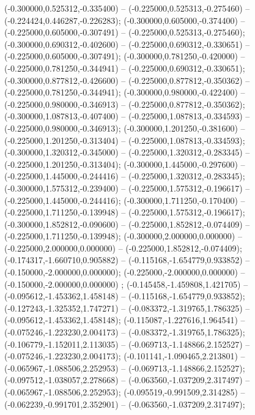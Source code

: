  (-0.300000,0.525312,-0.335400) -- (-0.225000,0.525313,-0.275460) -- (-0.224424,0.446287,-0.226283);
 (-0.300000,0.605000,-0.374400) -- (-0.225000,0.605000,-0.307491) -- (-0.225000,0.525313,-0.275460);
 (-0.300000,0.690312,-0.402600) -- (-0.225000,0.690312,-0.330651) -- (-0.225000,0.605000,-0.307491);
 (-0.300000,0.781250,-0.420000) -- (-0.225000,0.781250,-0.344941) -- (-0.225000,0.690312,-0.330651);
 (-0.300000,0.877812,-0.426600) -- (-0.225000,0.877812,-0.350362) -- (-0.225000,0.781250,-0.344941);
 (-0.300000,0.980000,-0.422400) -- (-0.225000,0.980000,-0.346913) -- (-0.225000,0.877812,-0.350362);
 (-0.300000,1.087813,-0.407400) -- (-0.225000,1.087813,-0.334593) -- (-0.225000,0.980000,-0.346913);
 (-0.300000,1.201250,-0.381600) -- (-0.225000,1.201250,-0.313404) -- (-0.225000,1.087813,-0.334593);
 (-0.300000,1.320312,-0.345000) -- (-0.225000,1.320312,-0.283345) -- (-0.225000,1.201250,-0.313404);
 (-0.300000,1.445000,-0.297600) -- (-0.225000,1.445000,-0.244416) -- (-0.225000,1.320312,-0.283345);
 (-0.300000,1.575312,-0.239400) -- (-0.225000,1.575312,-0.196617) -- (-0.225000,1.445000,-0.244416);
 (-0.300000,1.711250,-0.170400) -- (-0.225000,1.711250,-0.139948) -- (-0.225000,1.575312,-0.196617);
 (-0.300000,1.852812,-0.090600) -- (-0.225000,1.852812,-0.074409) -- (-0.225000,1.711250,-0.139948);
 (-0.300000,2.000000,0.000000) -- (-0.225000,2.000000,0.000000) -- (-0.225000,1.852812,-0.074409);
 (-0.174317,-1.660710,0.905882) -- (-0.115168,-1.654779,0.933852) -- (-0.150000,-2.000000,0.000000);
 (-0.225000,-2.000000,0.000000) -- (-0.150000,-2.000000,0.000000) ;
 (-0.145458,-1.459808,1.421705) -- (-0.095612,-1.453362,1.458148) -- (-0.115168,-1.654779,0.933852);
 (-0.127243,-1.325352,1.747271) -- (-0.083372,-1.319765,1.786325) -- (-0.095612,-1.453362,1.458148);
 (-0.115087,-1.227616,1.964541) -- (-0.075246,-1.223230,2.004173) -- (-0.083372,-1.319765,1.786325);
 (-0.106779,-1.152011,2.113035) -- (-0.069713,-1.148866,2.152527) -- (-0.075246,-1.223230,2.004173);
 (-0.101141,-1.090465,2.213801) -- (-0.065967,-1.088506,2.252953) -- (-0.069713,-1.148866,2.152527);
 (-0.097512,-1.038057,2.278668) -- (-0.063560,-1.037209,2.317497) -- (-0.065967,-1.088506,2.252953);
 (-0.095519,-0.991509,2.314285) -- (-0.062239,-0.991701,2.352901) -- (-0.063560,-1.037209,2.317497);
